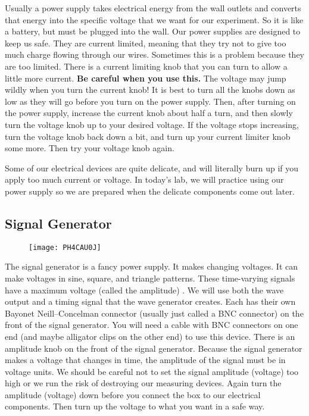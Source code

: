 Usually a power supply takes electrical energy from the wall outlets and converts that energy into the specific voltage that we want for our experiment. So it is like a battery, but must be plugged into the wall. Our power supplies are designed to keep us safe. They are current limited, meaning that they try not to give too much charge flowing through our wires. Sometimes this is a problem because they are too limited. There is a current limiting knob that you can turn to allow a little more current. \textbf{Be careful when you use this.} The voltage may jump wildly when you turn the current knob! It is best to turn all the knobs down as low as they will go before you turn on the power supply. Then, after turning on the power supply, increase the current knob about half a turn, and then slowly turn the voltage knob up to your desired voltage. If the voltage stops increasing, turn the voltage knob back down a bit, and turn up your current limiter knob some more. Then try your voltage knob again.

Some of our electrical devices are quite delicate, and will literally burn up if you apply too much current or voltage. In today's lab, we will practice using our power supply so we are prepared when the delicate components come out later.

\subsection{Signal Generator}

\begin{figure}[h!]
	\centering
	\texttt{[image: PH4CAU0J]}
\end{figure}

The signal generator is a fancy power supply. It makes changing voltages. It can make voltages in sine, square, and triangle patterns. These time-varying signals have a maximum voltage (called the amplitude) . We will use both the wave output and a timing signal that the wave generator creates. Each has their own Bayonet Neill--Concelman connector (usually just called a BNC connector) on the front of the signal generator. You will need a cable with BNC connectors on one end (and maybe alligator clips on the other end) to use this device. There is an amplitude knob on the front of the signal generator. Because the signal generator makes a voltage that changes in time, the amplitude of the signal must be in voltage units. We should be careful not to set the signal amplitude (voltage) too high or we run the risk of destroying our measuring devices. Again turn the amplitude (voltage) down before you connect the box to our electrical components. Then turn up the voltage to what you want in a safe way.

